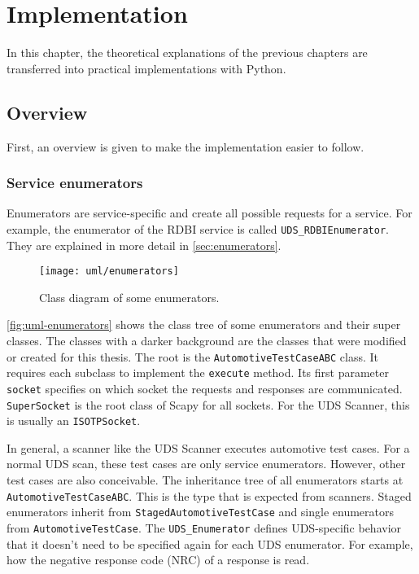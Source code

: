\chapter{Implementation}

In this chapter, the theoretical explanations of the previous chapters are transferred into practical implementations with Python.

\section{Overview}

First, an overview is given to make the implementation easier to follow.

\subsection{Service enumerators}

Enumerators are service-specific and create all possible requests for a service. For example, the enumerator of the RDBI service is called \texttt{UDS_RDBIEnumerator}. They are explained in more detail in \autoref{sec:enumerators}.

\begin{figure}[htb]
    \centering
    \texttt{[image: uml/enumerators]}
    \caption{Class diagram of some enumerators.}
    \label{fig:uml-enumerators}
\end{figure}

\autoref{fig:uml-enumerators} shows the class tree of some enumerators and their super classes. The classes with a darker background are the classes that were modified or created for this thesis. The root is the \texttt{AutomotiveTestCaseABC} class. It requires each subclass to implement the \texttt{execute} method. Its first parameter \texttt{socket} specifies on which socket the requests and responses are communicated. \texttt{SuperSocket} is the root class of Scapy for all sockets. For the UDS Scanner, this is usually an \texttt{ISOTPSocket}.

In general, a scanner like the UDS Scanner executes automotive test cases. For a normal UDS scan, these test cases are only service enumerators. However, other test cases are also conceivable. The inheritance tree of all enumerators starts at \texttt{AutomotiveTestCaseABC}. This is the type that is expected from scanners.
Staged enumerators inherit from \texttt{StagedAutomotiveTestCase} and single enumerators from \texttt{AutomotiveTestCase}. The \texttt{UDS_Enumerator} defines UDS-specific behavior that it doesn't need to be specified again for each UDS enumerator. For example, how the negative response code (NRC) of a response is read.

